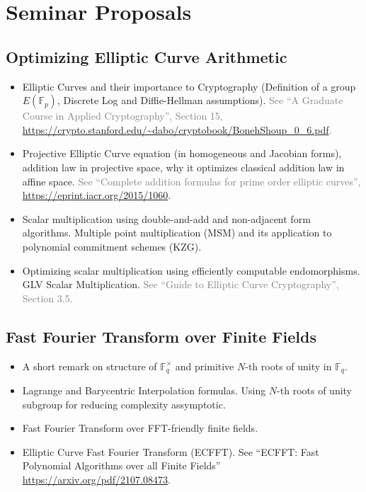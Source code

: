 \documentclass{template}
\begin{document}
\section*{Seminar Proposals}

\subsection*{Optimizing Elliptic Curve Arithmetic}

\begin{itemize}
    \item Elliptic Curves and their importance to Cryptography (Definition of a
    group $E(\mathbb{F}_p)$, Discrete Log and Diffie-Hellman assumptions). \textcolor{gray}{See
    ``A Graduate Course in Applied Cryptography'', Section 15,
    \url{https://crypto.stanford.edu/~dabo/cryptobook/BonehShoup_0_6.pdf}.}
    \item Projective Elliptic Curve equation (in homogeneous and Jacobian
    forms), addition law in projective space, why it optimizes classical
    addition law in affine space. \textcolor{gray}{See ``Complete addition
    formulas for prime order elliptic curves'',
    \url{https://eprint.iacr.org/2015/1060}}.
    \item Scalar multiplication using double-and-add and non-adjacent form
    algorithms. Multiple point multiplication (MSM) and its application to
    polynomial commitment schemes (KZG).
    \item Optimizing scalar multiplication using efficiently computable
    endomorphisms. GLV Scalar Multiplication. \textcolor{gray}{See ``Guide to
    Elliptic Curve Cryptography'', Section 3.5.}
\end{itemize}

\subsection*{Fast Fourier Transform over Finite Fields}

\begin{itemize}
    \item A short remark on structure of $\mathbb{F}_q^{\times}$ and primitive
    $N$-th roots of unity in $\mathbb{F}_q$.
    \item Lagrange and Barycentric Interpolation formulas. Using $N$-th roots of
    unity subgroup for reducing complexity assymptotic. 
    \item Fast Fourier Transform over FFT-friendly finite fields.
    \item Elliptic Curve Fast Fourier Transform (ECFFT). See ``ECFFT: Fast
    Polynomial Algorithms over all Finite Fields''
    \url{https://arxiv.org/pdf/2107.08473}.
\end{itemize}
\end{document}
